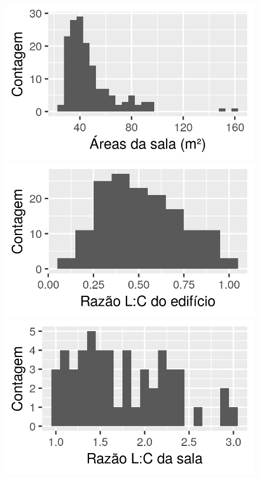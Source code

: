 \documentclass[brazil,hardcopy,openany,a4paper]{ufscthesis}
\begin{document}
\begin{figure}[H]
\begin{minipage}{.5\textwidth}
		\end{minipage}%
		\begin{minipage}{.5\textwidth}
			\centering
			\includegraphics[width=\linewidth]{img/hist_area_zonas.png}
		\end{minipage}
		\centering
		\begin{minipage}{.5\textwidth}
			\centering
			\includegraphics[width=\linewidth]{img/hist_ratio_edificio.png}
		\end{minipage}%
		\begin{minipage}{.5\textwidth}
			\centering
			\includegraphics[width=\linewidth]{img/hist_ratio_sala.png}
		\end{minipage}
	\end{figure}
\end{document}

